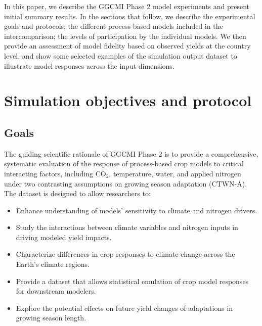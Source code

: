\documentclass[gmd, manuscript]{copernicus} %
\begin{document}
In this paper, we describe the GGCMI Phase 2 model experiments and present initial summary results.
In the sections that follow, we describe the experimental goals and protocols; the different process-based models included in the intercomparison; the levels of participation by the individual models. We then provide an assessment of model fidelity based on observed yields at the country level, and show some selected examples of the simulation output dataset to illustrate model responses across the input dimensions.

\section{Simulation objectives and protocol}
\label{S:2}
\subsection{Goals}

The guiding scientific rationale of GGCMI Phase 2 is to provide a comprehensive, systematic evaluation of the response of process-based crop models to critical interacting factors, including CO$_2$, temperature, water, and applied nitrogen under two contrasting assumptions on growing season adaptation (CTWN-A). 
The dataset is designed to allow researchers to:
\begin{itemize}
    \item Enhance understanding of models’ sensitivity to climate and nitrogen drivers.
    \item Study the interactions between climate variables and nitrogen inputs in driving modeled yield impacts. 
    \item Characterize differences in crop responses to climate change across the Earth's climate regions.
    \item Provide a dataset that allows statistical emulation of crop model responses for downstream modelers.
    \item Explore the potential effects on future yield changes of adaptations in growing season length.
\end{itemize}
\vspace{-0.05in}
\end{document}
